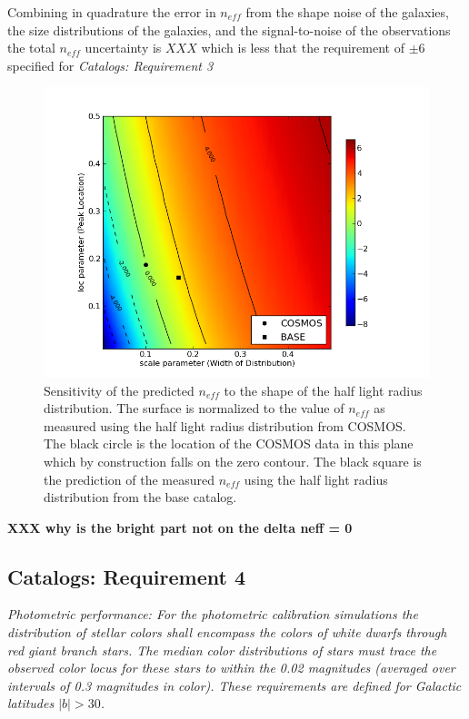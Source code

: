 \documentclass[]{article}
\begin{document}
Combining in quadrature the error in $n_{eff}$ from the shape noise of
the galaxies, the size distributions of the galaxies, and the
signal-to-noise of the observations the total $n_{eff}$ uncertainty is
$XXX$ which is less that the requirement of  $\pm6$ specified for {\it
  Catalogs:  Requirement 3}


\begin{figure}[H]
\centering
\includegraphics[width=5in]{validation_figures/size_sensitivity.png}
\caption{Sensitivity of the predicted $n_{eff}$ to the shape of the half light radius distribution.  
The surface is normalized to the value of $n_{eff}$ as measured using the half light radius distribution from COSMOS.  The black circle
is the location of the COSMOS data in this plane which by construction falls on the zero contour.  The black square is the prediction of
the measured $n_{eff}$ using the half light radius distribution from the base catalog.\label{fig:size_sens}}
\end{figure}
{\bf XXX why is the bright part not on the delta neff = 0}


\subsection{Catalogs: Requirement 4}

{\it Photometric performance: For the photometric calibration
  simulations the distribution of stellar colors shall encompass the
  colors of white dwarfs through red giant branch stars.  The median
  color distributions of stars must trace the observed color locus for
  these stars to within the 0.02 magnitudes (averaged over intervals
  of 0.3 magnitudes in color). These requirements are defined for
  Galactic latitudes $|b|>30$.}\\
\end{document}
